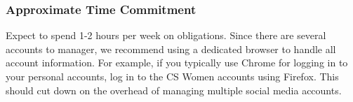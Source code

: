 \subsubsection{Approximate Time Commitment}
Expect to spend 1-2 hours per week on obligations. Since there are several accounts to manager, we recommend using a dedicated browser to handle all account information. For example, if you typically use Chrome for logging in to your personal accounts, log in to the CS Women accounts using Firefox. This should cut down on the overhead of managing multiple social media accounts.